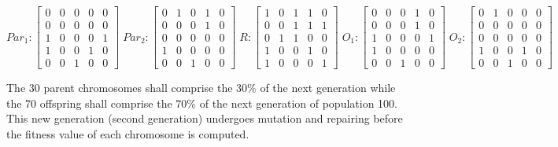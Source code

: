      $$
        Par_{1} : \begin{bmatrix}
            0 & 0 & 0 & 0 & 0 \\
            0 & 0 & 0 & 0 & 0 \\
            1 & 0 & 0 & 0 & 1 \\
			1 & 0 & 0 & 1 & 0 \\
            0 & 0 & 1 & 0 & 0 
        \end{bmatrix}
        \;
        Par_{2} : \begin{bmatrix}
            0 & 1 & 0 & 1 & 0 \\
            0 & 0 & 0 & 1 & 0 \\
            0 & 0 & 0 & 0 & 0 \\
            1 & 0 & 0 & 0 & 0 \\
            0 & 0 & 1 & 0 & 0
        \end{bmatrix}
        \;
        R : \begin{bmatrix}
            1 & 0 & 1 & 1 & 0 \\
            0 & 0 & 1 & 1 & 1 \\
            0 & 1 & 1 & 0 & 0 \\
            1 & 0 & 0 & 1 & 0 \\
            1 & 0 & 0 & 0 & 1
        \end{bmatrix}
        \;
        O_{1} : \begin{bmatrix}
            0 & 0 & 0 & 1 & 0 \\
            0 & 0 & 0 & 1 & 0 \\
            1 & 0 & 0 & 0 & 1 \\
            1 & 0 & 0 & 0 & 0 \\
            0 & 0 & 1 & 0 & 0
        \end{bmatrix}
        \;
        O_{2} : \begin{bmatrix}
            0 & 1 & 0 & 0 & 0 \\
            0 & 0 & 0 & 0 & 0 \\
            0 & 0 & 0 & 0 & 0 \\
            1 & 0 & 0 & 1 & 0 \\
            0 & 0 & 1 & 0 & 0
        \end{bmatrix}
    $$ 
    \fontsize{12}{12}\selectfont
    \doublespacing
    
    The 30 parent chromosomes shall comprise the $30\%$ of the next generation while the 70 offspring shall comprise the $70\%$ of the next generation of population 100. This new generation (second generation) undergoes mutation and repairing before the fitness value of each chromosome is computed.
    
